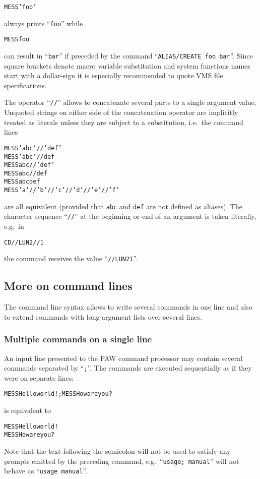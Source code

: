 \begin{alltt}
MESS 'foo'
\end{alltt}
always prints ``\texttt{foo}'' while
\begin{alltt}
MESS foo
\end{alltt}

can result in ``\texttt{bar}'' if preceded by the command
``\texttt{ALIAS/CREATE foo bar}''. Since square brackets denote macro variable 
substitution and system functions names start with a dollar-sign it is 
especially recommended to quote VMS file specifications.

The operator ``\texttt{//}'' allows to concatenate several parts to a single 
argument value. Unquoted strings on either side of the concatenation operator 
are implicitly treated as literals unless they are subject to a substitution, 
i.e.\ the command lines

\begin{alltt}
MESS 'abc'//'def'
MESS 'abc'//def
MESS abc//'def'
MESS abc//def
MESS abcdef
MESS 'a'//'b'//'c'//'d'//'e'//'f'
\end{alltt}

are all equivalent (provided that \texttt{abc} and \texttt{def} are not defined 
as aliases). The character sequence ``\texttt{//}'' at the beginning or end of 
an argument is taken literally, e.g.\ in

\begin{alltt}
CD //LUN2//1
\end{alltt}

the command receives the value ``\texttt{//LUN21}''.


\subsection{More on command lines}

The command line syntax allows to write several commands in one line
and also to extend commands with long argument
lists over several lines.


\subsubsection{Multiple commands on a single line\label{sec-mult-cmd}}

An input line presented to the PAW command processor may contain
several commands separated by ``\texttt{;}''.
The commands are executed sequentially as if they were on separate
lines:
\begin{alltt}
MESS Hello world!; MESS How are you?
\end{alltt}
is equivalent to
\begin{alltt}
MESS Hello world!
MESS How are you?
\end{alltt}
Note that the text following the semicolon will not be used to satisfy
any prompts emitted by the preceding command, 
e.g.\ ``\texttt{usage; manual}'' will not behave as 
``\texttt{usage manual}''.

